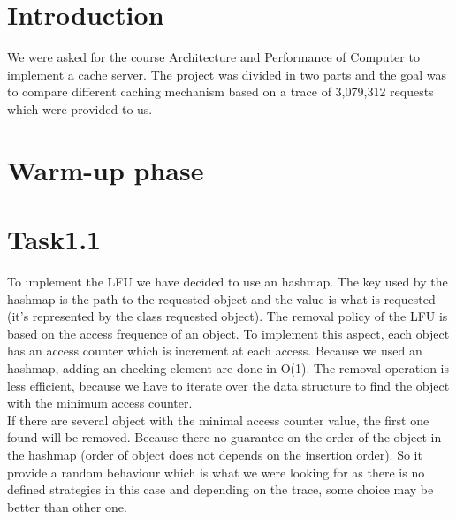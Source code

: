 \section{Introduction}
We were asked for the course Architecture and Performance of Computer to
implement a cache server. The project was divided in two parts and the 
goal was to compare different caching mechanism based on a trace
of 3,079,312 requests which were provided to us.

\section{Warm-up phase}


\section{Task1.1}


To implement the LFU we have decided to use an hashmap. The key used 
by the hashmap is the path to the requested object and the value is what
is requested (it's represented by the class requested object). The removal
policy of the LFU is based on the access frequence of an object. To
implement this aspect, each object has an access counter which is 
increment at each access. Because we used an hashmap, adding an 
checking element are done in O(1). The removal operation is less efficient,
because we have to iterate over the data structure to find the object with
the minimum access counter.\\
If there are several object with the minimal access counter value, the first
one found will be removed. Because there no guarantee on the order of
the object in the hashmap (order of object does not depends on the 
insertion order). So it provide a random behaviour which is what we
were looking for as there is no defined strategies in this case and  
depending on the trace, some choice may be better than other one. 


